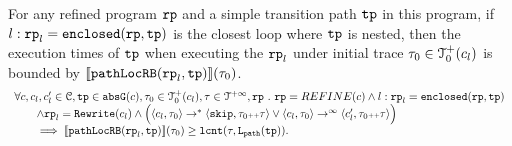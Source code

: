 \begin{lemma}
  For any refined program $\mathtt{rp}$ and a simple transition path $\mathtt{tp}$ in this program,
  if $l: \mathtt{rp}_l = \mathtt{enclosed}(\mathtt{rp}, \mathtt{tp})$ is the closest loop where $\mathtt{tp}$ is nested,
  then the execution times of $\mathtt{tp}$ when executing the $\mathtt{rp}_l$ under initial trace $\mathtt{\tau}_0 \in \mathcal{T}^{+}_0(c_l)$ is bounded by $\llbracket \mathtt{pathLocRB}(\mathtt{rp}_l, \mathtt{tp}) \rrbracket(\mathtt{\tau}_0)$.
  \[
    \begin{array}{l}
    \forall c, c_l, c_l' \in \mathcal{C}, \mathtt{tp} \in \mathtt{abs}{\mathtt{G}}(c), \mathtt{\tau}_0 \in \mathcal{T}^{+}_0(c_l), \mathtt{\tau} \in \mathcal{T}^{+\infty}, \mathtt{rp} ~.~ 
    \mathtt{rp} = REFINE(c)
    \land
    l: \mathtt{rp}_l = \mathtt{enclosed}(\mathtt{rp}, \mathtt{tp})
    \\ \qquad
    \land 
    \mathtt{rp}_l = \mathtt{Rewrite}(c_l)
    \land
    \Big(
    \langle c_l, \mathtt{\tau}_0 \rangle \to^* \langle \mathtt{skip}, \mathtt{\tau}_0 {\scriptscriptstyle ++} \mathtt{\tau} \rangle
    \lor \langle c_l, \mathtt{\tau}_0 \rangle \to^\infty \langle c_l', \mathtt{\tau}_0 {\scriptscriptstyle ++} \mathtt{\tau} \rangle 
    \Big)
    \\ \qquad
    \implies
    \llbracket \mathtt{pathLocRB}(\mathtt{rp}_l, \mathtt{tp}) \rrbracket(\mathtt{\tau}_0) \geq \mathtt{lcnt}(\mathtt{\tau}, \mathtt{L}_{\mathtt{path}}(\mathtt{tp})).
    \end{array}
  \]  
 
  \end{lemma}
